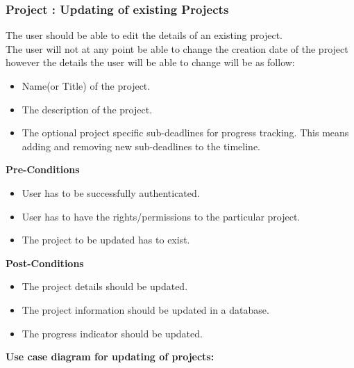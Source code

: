 \subsubsection{Project : Updating of existing Projects}
	The user should be able to edit the details of an existing project.\\
	 The user will not at any point be able to change the creation date of the project however the details the user will be able to change will be as follow:
	\begin{itemize}
		\item Name(or Title) of the project.
		\item The description of the project.
		\item The optional project specific sub-deadlines for progress tracking. This means adding and removing new sub-deadlines to the timeline.\\
	\end{itemize}
\textbf{Pre-Conditions}
\begin{itemize}
	\item User has to be successfully authenticated.
	\item User has to have the rights/permissions to the particular project.
	\item The project to be updated has to exist. \\
\end{itemize}
\textbf{Post-Conditions}
\begin{itemize}
	\item The project details should be updated.
	\item The project information should be updated in a database.
	\item The progress indicator should be updated.\\
\end{itemize}
\textbf{Use case diagram for updating of projects: }\\
\centerline{}

